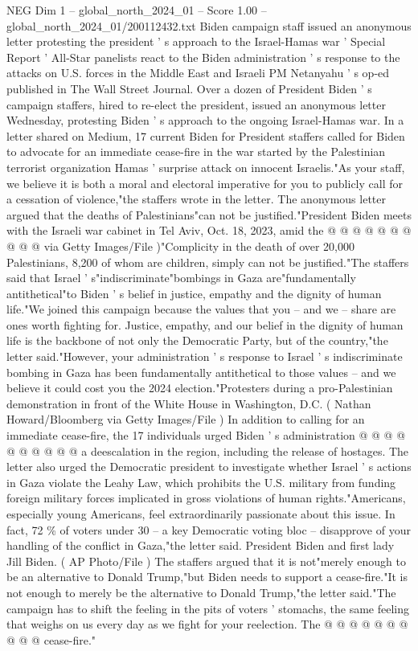 \begin{textsample}{NEG Dim 1 – global\_north\_2024\_01 – Score 1.00 – global\_north\_2024\_01/200112432.txt}  \label{ex:f1_neg_298}
Biden campaign staff issued an anonymous letter protesting the president ' s approach to the Israel-Hamas war ' Special Report ' All-Star panelists react to the Biden administration ' s response to the attacks on U.S. forces in the Middle East and Israeli PM Netanyahu ' s op-ed published in The Wall Street Journal.
Over a dozen of President Biden ' s campaign staffers, hired to re-elect the president, issued an anonymous letter Wednesday, protesting Biden ' s approach to the ongoing Israel-Hamas war.
In a letter shared on Medium, 17 current Biden for President staffers called for Biden to advocate for an immediate cease-fire in the war started by the Palestinian terrorist organization Hamas ' surprise attack on innocent Israelis."As your staff, we believe it is both a moral and electoral imperative for you to publicly call for a cessation of violence,"the staffers wrote in the letter.
The anonymous letter argued that the deaths of Palestinians"can not be justified."President Biden meets with the Israeli war cabinet in Tel Aviv, Oct. 18, 2023, amid the @ @ @ @ @ @ @ @ @ @ via Getty Images/File )"Complicity in the death of over 20,000 Palestinians, 8,200 of whom are children, simply can not be justified."The staffers said that Israel ' s"indiscriminate"bombings in Gaza are"fundamentally antithetical"to Biden ' s belief in justice, empathy and the dignity of human life."We joined this campaign because the values that you -- and we -- share are ones worth fighting for.
Justice, empathy, and our belief in the dignity of human life is the backbone of not only the Democratic Party, but of the country,"the letter said."However, your administration ' s response to Israel ' s indiscriminate bombing in Gaza has been fundamentally antithetical to those values -- and we believe it could cost you the 2024 election."Protesters during a pro-Palestinian demonstration in front of the White House in Washington, D.C. ( Nathan Howard/Bloomberg via Getty Images/File ) In addition to calling for an immediate cease-fire, the 17 individuals urged Biden ' s administration @ @ @ @ @ @ @ @ @ @ a deescalation in the region, including the release of hostages.
The letter also urged the Democratic president to investigate whether Israel ' s actions in Gaza violate the Leahy Law, which prohibits the U.S. military from funding foreign military forces implicated in gross violations of human rights."Americans, especially young Americans, feel extraordinarily passionate about this issue.
In fact, 72 \% of voters under 30 -- a key Democratic voting bloc -- disapprove of your handling of the conflict in Gaza,"the letter said.
President Biden and first lady Jill Biden. ( AP Photo/File ) The staffers argued that it is not"merely enough to be an alternative to Donald Trump,"but Biden needs to support a cease-fire."It is not enough to merely be the alternative to Donald Trump,"the letter said."The campaign has to shift the feeling in the pits of voters ' stomachs, the same feeling that weighs on us every day as we fight for your reelection.
The @ @ @ @ @ @ @ @ @ @ cease-fire."

\end{textsample}
